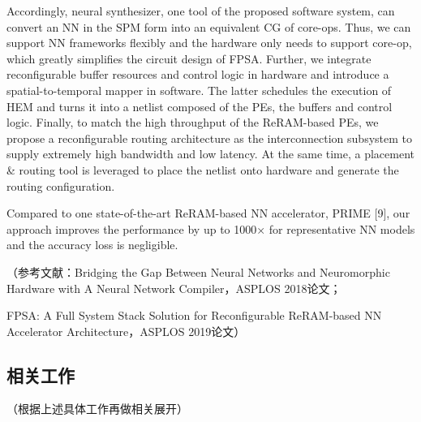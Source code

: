 \begin{itemize}
    Accordingly, neural synthesizer, one tool of the proposed software system, can convert an NN in the SPM form into an equivalent CG of core-ops. Thus, we can support NN frameworks flexibly and the hardware only needs to support core-op, which greatly simplifies the circuit design of FPSA. Further, we integrate reconfigurable buffer resources and control logic in hardware and introduce a spatial-to-temporal mapper in software. The latter schedules the execution of HEM and turns it into a netlist composed of the PEs, the buffers and control logic. Finally, to match the high throughput of the ReRAM-based PEs, we propose a reconfigurable routing architecture as the interconnection subsystem to supply extremely high bandwidth and low latency. At the same time, a placement \& routing tool is leveraged to place the netlist onto hardware and generate the routing configuration.

    Compared to one state-of-the-art ReRAM-based NN accelerator, PRIME [9], our approach improves the performance by up to 1000× for representative NN models and the accuracy loss is negligible. 
\end{itemize}

（参考文献：Bridging the Gap Between Neural Networks and Neuromorphic Hardware with A Neural Network Compiler，ASPLOS 2018论文；

FPSA: A Full System Stack Solution for Reconfigurable ReRAM-based NN Accelerator Architecture，ASPLOS 2019论文）

\subsection{相关工作}
（根据上述具体工作再做相关展开）
